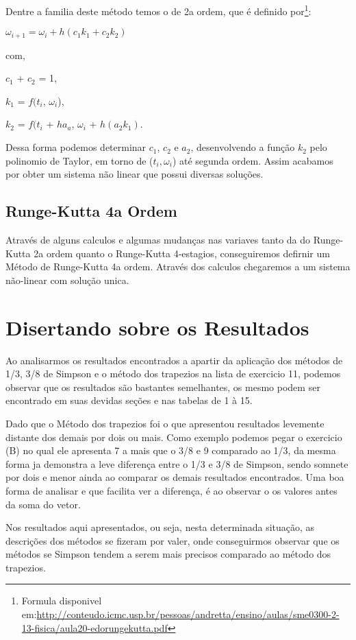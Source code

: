 \documentclass[12pt]{article}
\begin{document}
Dentre a familia deste método temos o de 2a ordem, que é definido por\footnote{Formula disponivel em:\url{http://conteudo.icmc.usp.br/pessoas/andretta/ensino/aulas/sme0300-2-13-fisica/aula20-edorungekutta.pdf}}:

$\omega_{i+1} = \omega_{i} + h(c_{1}k_{1} + c_{2}k_{2})$

com,

$c_{1}$ + $c_{2}$ = 1,

$k_{1}$ = $f(t_{i}$, $\omega_{i}$),

$k_{2}$ = $f(t_{i}$ + $ha_{a}$, $\omega_{i}$ + $h(a_{2}k_{1})$.


Dessa forma podemos determinar $c_{1}$, $c_{2}$ e $a_{2}$, desenvolvendo a função $k_{2}$ pelo polinomio de Taylor, em torno de ($t_{i}, \omega_{i}$) até segunda ordem. Assim acabamos por obter um sistema não linear que possui diversas soluções.

\subsection{Runge-Kutta 4a Ordem}
Através de alguns calculos e algumas mudanças nas variaves tanto da do Runge-Kutta 2a ordem quanto o Runge-Kutta 4-estagios, conseguiremos defirnir um Método de Runge-Kutta 4a ordem. Através dos calculos chegaremos a um sistema não-linear com solução unica.

\section{Disertando sobre os Resultados}

Ao analisarmos os resultados encontrados a apartir da aplicação dos métodos de 1/3, 3/8 de Simpson e o método dos trapezios na lista de exercicio 11, podemos observar que os resultados são bastantes semelhantes, os mesmo podem ser encontrado em suas devidas seções e nas tabelas de 1 à 15.

Dado que o Método dos trapezios foi o que apresentou resultados levemente distante dos demais por dois ou mais. Como exemplo podemos pegar o exercicio (B) no qual ele apresenta 7 a mais que o 3/8 e 9 comparado ao 1/3, da mesma forma ja demonstra a leve diferença entre o 1/3 e 3/8 de Simpson, sendo somnete por dois e menor ainda ao comparar os demais resultados encontrados. Uma boa forma de analisar e que facilita ver a diferença, é ao observar o os valores antes da soma do vetor.

Nos resultados aqui apresentados, ou seja, nesta determinada situação, as descrições dos métodos se fizeram por valer, onde conseguirmos observar que os métodos se Simpson tendem a serem mais precisos comparado ao método dos trapezios.
\end{document}
